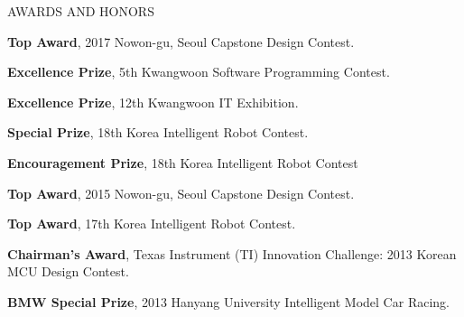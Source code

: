 \begin{rSection}{AWARDS AND HONORS}
    \begin{rSubsection}{}{}{}{}                
       \item \textbf{Top Award}, 2017 Nowon-gu, Seoul Capstone Design Contest.
       \item \textbf{Excellence Prize}, 5th Kwangwoon Software Programming Contest.
       \item \textbf{Excellence Prize}, 12th Kwangwoon IT Exhibition.
       \item \textbf{Special Prize}, 18th Korea Intelligent Robot Contest.
       \item \textbf{Encouragement Prize}, 18th Korea Intelligent Robot Contest
       \item \textbf{Top Award}, 2015 Nowon-gu, Seoul Capstone Design Contest.
       \item \textbf{Top Award}, 17th Korea Intelligent Robot Contest.
       \item \textbf{Chairman's Award}, Texas Instrument (TI) Innovation Challenge: 2013 Korean MCU Design Contest.
       \item \textbf{BMW Special Prize}, 2013 Hanyang University Intelligent Model Car Racing.
    \end{rSubsection}         
\end{rSection}
